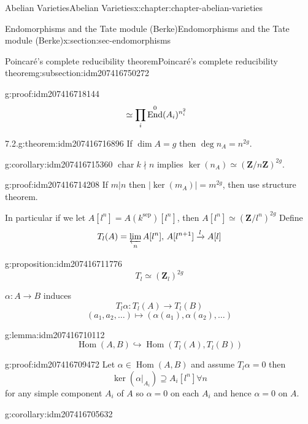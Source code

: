 \documentclass[oneside,10pt,]{book}
\newcommand{\qedhere}{\relax}
\numberwithin{equation}{section}
\newcommand{\lb}{[}
\newcommand{\rb}{]}
\newcommand{\ZZ}{\mathbf{Z}}
\newcommand{\sep}{\mathrm{sep}}
\DeclareMathOperator{\End}{End}
\DeclareMathOperator{\Hom}{Hom}
\DeclareMathOperator{\characteristic}{char}
\newcommand{\amp}{&}
\begin{document}
\begin{chapterptx}{Abelian Varieties}{}{Abelian Varieties}{}{}{x:chapter:chapter-abelian-varieties}
\begin{sectionptx}{Endomorphisms and the Tate module (Berke)}{}{Endomorphisms and the Tate module (Berke)}{}{}{x:section:sec-endomorphisms}
\begin{subsectionptx}{Poincaré's complete reducibility theorem}{}{Poincaré's complete reducibility theorem}{}{}{g:subsection:idm207416750272}
\begin{proofptx}{}{g:proof:idm207416718144}
\begin{align*}
\amp \simeq \prod_{i} \End^0(A_i)^{n_i^2}\qedhere
\end{align*}
%
\end{proofptx}
\begin{theorem}{7.2.}{}{g:theorem:idm207416716896}%
If \(\dim A = g\) then \(\deg n_A  =n^{2g}\).%
\end{theorem}
\begin{corollary}{}{}{g:corollary:idm207416715360}%
\(\characteristic k \nmid n\) implies \(\ker(n_A) \simeq (\ZZ/n\ZZ)^{2g}\).%
\end{corollary}
\begin{proofptx}{}{g:proof:idm207416714208}
If  \(m | n\) then \(|\ker (m_A)| = m^{2g}\), then use structure theorem.%
\end{proofptx}
In particular if we let \(A\lb l^n\rb = A(k^\sep) \lb l^n\rb\), then \(A\lb l^n\rb \simeq (\ZZ/l^n)^{2g}\) Define%
\begin{equation*}
T_l(A) = \varprojlim_n A[l^n],\, A[l^{n+1}] \xrightarrow{l} A[l]
\end{equation*}
%
\begin{proposition}{}{}{g:proposition:idm207416711776}%
%
\begin{equation*}
T_l \simeq (\ZZ_l)^{2g}
\end{equation*}
%
\end{proposition}
\(\alpha \colon A \to B\) induces%
\begin{equation*}
T_l\alpha\colon T_l(A) \to T_l(B)
\end{equation*}
%
\begin{equation*}
(a_1,a_2, \ldots) \mapsto(\alpha(a_1),\alpha(a_2), \ldots)
\end{equation*}
%
\begin{lemma}{}{}{g:lemma:idm207416710112}%
%
\begin{equation*}
\Hom(A,B) \hookrightarrow \Hom(T_l(A), T_l(B))
\end{equation*}
%
\end{lemma}
\begin{proofptx}{}{g:proof:idm207416709472}
Let \(\alpha \in \Hom(A,B)\) and assume \(T_l \alpha = 0\) then%
\begin{equation*}
\ker (\alpha|_{A_i}) \supseteq A_i[l^n] \forall n
\end{equation*}
for any simple component \(A_i\) of \(A\) so \(\alpha =0\) on each \(A_i\) and hence \(\alpha = 0\) on \(A\).%
\end{proofptx}
\begin{corollary}{}{}{g:corollary:idm207416705632}%

\end{corollary}
\end{subsectionptx}
\end{sectionptx}
\end{chapterptx}
\end{document}
